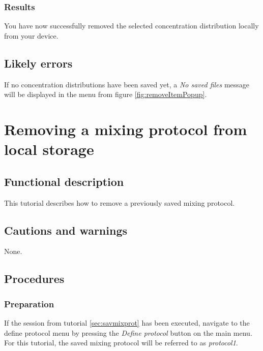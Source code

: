 \subsubsection{Results}
You have now successfully removed the selected concentration distribution locally from your device.

\subsection{Likely errors}
If no concentration distributions have been saved yet, a \emph{No saved files} message will be displayed in the menu from figure \ref{fig:removeItemPopup}.

\section{Removing a mixing protocol from local storage}\label{sec:remmixprot}

\subsection{Functional description}
This tutorial describes how to remove a previously saved mixing protocol.

\subsection{Cautions and warnings}
None.

\subsection{Procedures}

\subsubsection{Preparation}
If the session from tutorial \ref{sec:savmixprot} has been executed, navigate to the define protocol menu by pressing the \emph{Define protocol} button on the main menu.
For this tutorial, the saved mixing protocol will be referred to as \emph{protocol1}.


